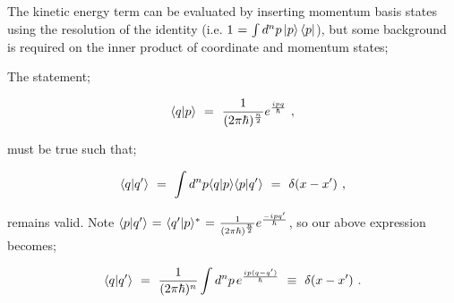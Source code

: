 \documentclass{article}
\begin{document}
The kinetic energy term can be evaluated by inserting momentum basis states using the resolution of the identity (i.e. \begin{math} 1 \hspace{0.025cm} = \hspace{0.025cm} \int d^n p \ket{p} \bra{p} \end{math}), but some background is required on the inner product of coordinate and momentum states;

The statement;

\begin{equation} \label{eq:1}
\langle q | p \rangle \hspace{0.125cm} = \hspace{0.125cm} \frac{1}{(2 \pi \hbar)^{\frac{n}{2}}} e^{\frac{i p q}{\hbar}} \hspace{0.125cm} , 
\end{equation}

must be true such that;

\begin{equation} \label{eq:1}
\langle q | q' \rangle \hspace{0.125cm} = \hspace{0.125cm} \int d^n p \langle q | p \rangle \langle p | q' \rangle \hspace{0.125cm} = \hspace{0.125cm} \delta ( x - x' )  \hspace{0.125cm} , 
\end{equation}

remains valid. Note \begin{math} \langle p | q' \rangle  \hspace{0.025cm} = \hspace{0.025cm} \langle q' | p \rangle^{*} \hspace{0.025cm} = \hspace{0.025cm} \frac{1}{(2 \pi \hbar)^{\frac{n}{2}}} e^{\frac{- i p q'}{\hbar}}  \end{math}, so our above expression becomes;

\begin{equation} \label{eq:1}
\langle q | q' \rangle \hspace{0.125cm} = \hspace{0.125cm} \frac{1}{(2 \pi \hbar)^{n}} \int d^n p \hspace{0.05cm} e^{\frac{i p (q - q')}{\hbar}} \hspace{0.125cm} \equiv \hspace{0.125cm} \delta ( x - x' ) \hspace{0.125cm} .
\end{equation}
\end{document}
